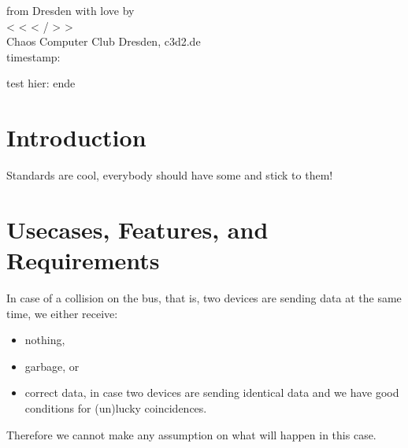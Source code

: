 \documentclass[a4paper,12pt]{scrartcl}
\title{\haqbus}
\author{C3D2}
\date{}
\newcommand{\haqbus}{ha\textsuperscript{q}\textsubscript{b}us}
\begin{document}
\maketitle

\begin{abstract}
This is the very first draft of the \haqbus protocol specification. The haqbus is an EIA-485 (aka RS-485) based field communication system connecting arbitrary devices for hackerspace-automation.
\end{abstract}

\vspace{5cm}
\thispagestyle{empty}
\begin{center}
from Dresden with love by \\
\Large
< < < / > >  \\
\Large
Chaos Computer Club Dresden, c3d2.de \\
 timestamp:   
\end{center}
test hier:  ende 
\newpage
\tableofcontents
\newpage
\section{Introduction}
Standards are cool, everybody should have some and stick to them!


\section{Usecases, Features, and Requirements}

In case of a collision on the bus, that is, two devices are sending data at the same time, we either receive:
\begin{itemize}
\item nothing,
\item garbage, or
\item correct data, in case two devices are sending identical data and we have good conditions for (un)lucky coincidences.
\end{itemize}
Therefore we cannot make any assumption on what will happen in this case.
\end{document}
